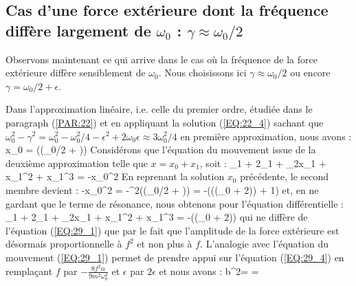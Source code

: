 \subsection{Cas d'une force ext\'{e}rieure dont la fr\'{e}quence diff\`{e}re largement de $\omega_{0}$ : $\gamma \approx \omega_{0}/2$}

Observons maintenant ce qui arrive dans le cas o\`{u} la fr\'{e}quence de la force ext\'{e}rieure diff\`{e}re sensiblement de $\omega_{0}$. Nous choisissons ici $\gamma \approx \omega_{0}/2$ ou encore $\gamma = \omega_{0}/2 + \epsilon$.

Dans l'approximation lin\'{e}aire, i.e. celle du premier ordre, \'{e}tudi\'{e}e dans le paragraph (\ref{PAR:22}) et en appliquant la solution (\ref{EQ:22_4}) sachant que $\omega_{0}^{2} - \gamma^{2} = \omega_{0}^{2} - \omega_{0}^{2}/4 - \epsilon^{2} + 2\omega_{0}\epsilon \approx 3\omega_{0}^{2}/4$ en premi\`{e}re approximation, nous avons :
\benn
	x_{0} = \cos\left((\omega_{0}/2 + \epsilon)\right)
\eenn
Consid\'{e}rons que l'\'{e}quation du mouvement issue de la deuxi\`{e}me approximation telle que $x = x_{0} + x_{1}$, soit :
\benn
	_{1} + 2\lambda{}_{1} + \omega_{2}x_{1} + \alpha x_{1}^{2} + \beta x_{1}^{3} = -\alpha x_{0}^{2}
\eenn
En reprenant la solution $x_{0}$ pr\'{e}c\'{e}dente, le second membre devient :
\benn
	-\alpha x_{0}^{2} = -\cos^{2}\left((\omega_{0}/2 + \epsilon)\right) = -\left(\cos\left((\omega_{0} + 2\epsilon)\right) + 1\right)
\eenn
et, en ne gardant que le terme de r\'{e}sonance, nous obtenons pour l'\'{e}quation diff\'{e}rentielle :
\be
	_{1} + 2\lambda{}_{1} + \omega_{2}x_{1} + \alpha x_{1}^{2} + \beta x_{1}^{3} = -\cos\left((\omega_{0} + 2\epsilon)\right) \label{EQ:29_8}
\ee
qui ne diff\`{e}re de l'\'{e}quation (\ref{EQ:29_1}) que par le fait que l'amplitude de la force ext\'{e}rieure est d\'{e}sormais proportionnelle \`{a} $f^{2}$ et non plus \`{a} $f$. L'analogie avec l'\'{e}quation du mouvement (\ref{EQ:29_1}) permet de prendre appui sur l'\'{e}quation (\ref{EQ:29_4}) en rempla\c{c}ant $f$ par $-\frac{8f^{2}\alpha}{9m^{2}\omega_{0}^{4}}$ et $\epsilon$ par $2\epsilon$ et nous avons :
\be
	b^{2} =  =  \label{EQ:29_9}
\ee


